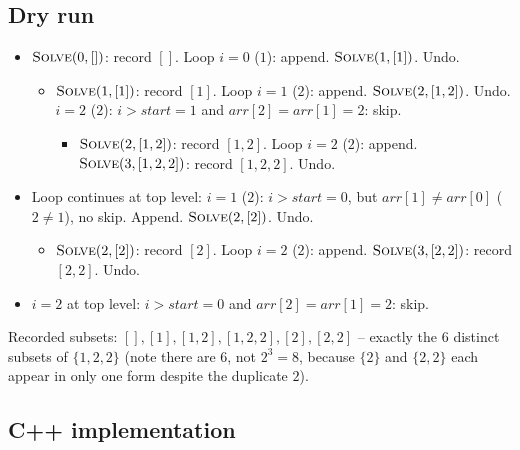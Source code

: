 \subsection*{Dry run}


\begin{itemize}
  \item $\textsc{Solve}(0,[])$: record $[]$. Loop $i=0$ ($1$): append.
        $\textsc{Solve}(1,[1])$. Undo.
  \begin{itemize}
    \item $\textsc{Solve}(1,[1])$: record $[1]$. Loop $i=1$ ($2$):
          append. $\textsc{Solve}(2,[1,2])$. Undo. $i=2$ ($2$): $i>
          \textit{start}=1$ and $\textit{arr}[2]=\textit{arr}[1]=2$:
          skip.
    \begin{itemize}
      \item $\textsc{Solve}(2,[1,2])$: record $[1,2]$. Loop $i=2$
            ($2$): append. $\textsc{Solve}(3,[1,2,2])$: record
            $[1,2,2]$. Undo.
    \end{itemize}
  \end{itemize}
  \item Loop continues at top level: $i=1$ ($2$): $i>\textit{start}=0$,
        but $\textit{arr}[1] \ne \textit{arr}[0]$ ($2\ne1$), no skip.
        Append. $\textsc{Solve}(2,[2])$. Undo.
  \begin{itemize}
    \item $\textsc{Solve}(2,[2])$: record $[2]$. Loop $i=2$ ($2$):
          append. $\textsc{Solve}(3,[2,2])$: record $[2,2]$. Undo.
  \end{itemize}
  \item $i=2$ at top level: $i>\textit{start}=0$ and
        $\textit{arr}[2]=\textit{arr}[1]=2$: skip.
\end{itemize}

Recorded subsets: $[], [1], [1,2], [1,2,2], [2], [2,2]$ -- exactly the
$6$ distinct subsets of $\{1,2,2\}$ (note there are $6$, not $2^3=8$,
because $\{2\}$ and $\{2,2\}$ each appear in only one form despite the
duplicate $2$).

\subsection*{C++ implementation}

